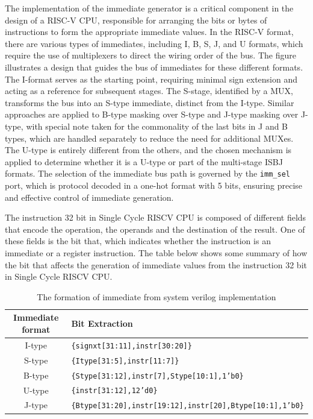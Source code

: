 \documentclass[12pt,a4paper,oneside]{book} %
\begin{document}
The implementation of the immediate generator is a critical component in the design of a RISC-V CPU, responsible for arranging the bits or bytes of instructions to form the appropriate immediate values. In the RISC-V format, there are various types of immediates, including I, B, S, J, and U formats, which require the use of multiplexers to direct the wiring order of the bus. The figure illustrates a design that guides the bus of immediates for these different formats. The I-format serves as the starting point, requiring minimal sign extension and acting as a reference for subsequent stages. The S-stage, identified by a MUX, transforms the bus into an S-type immediate, distinct from the I-type. Similar approaches are applied to B-type masking over S-type and J-type masking over J-type, with special note taken for the commonality of the last bits in J and B types, which are handled separately to reduce the need for additional MUXes. The U-type is entirely different from the others, and the chosen mechanism is applied to determine whether it is a U-type or part of the multi-stage ISBJ formats. The selection of the immediate bus path is governed by the \texttt{imm\_sel} port, which is protocol decoded in a one-hot format with 5 bits, ensuring precise and effective control of immediate generation.

The instruction 32 bit in Single Cycle RISCV CPU is composed of different fields that encode the operation, the operands and the destination of the result. One of these fields is the bit that, which indicates whether the instruction is an immediate or a register instruction. The table below shows some summary of how the bit that affects the generation of immediate values from the instruction 32 bit in Single Cycle RISCV CPU.

\begin{table}[H]
\centering
\caption{The formation of immediate from system verilog implementation}
\begin{tabular}{|c|l|}
\hline
\textbf{Immediate   format} & \textbf{Bit   Extraction}                              \\ \hline
I-type                      & \texttt{\{signxt[31:11],instr[30:20]\}}                           \\ \hline
S-type                      & \texttt{\{Itype[31:5],instr[11:7]\}}                              \\ \hline
B-type                      & \texttt{\{Stype[31:12],instr[7],Stype[10:1],1'b0\}}               \\ \hline
U-type                      & \texttt{\{instr[31:12],12'd0\}}                                   \\ \hline
J-type                      & \texttt{\{Btype[31:20],instr[19:12],instr[20],Btype[10:1],1'b0\}} \\ \hline
\end{tabular}
\end{table}
\end{document}
